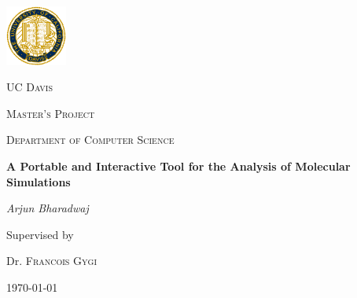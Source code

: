 \begin{titlepage}
	\centering
	\includegraphics[width=0.15\textwidth]{ucdavis_logo}\par\vspace{1cm}
	{\scshape\LARGE UC Davis \par}
	\vspace{1cm}
	{\scshape\Large Master's Project\par}
	\vspace{1cm}
	{\scshape\Large Department of Computer Science\par}
	\vspace{1.5cm}
	{\huge\bfseries A Portable and Interactive Tool for the Analysis of Molecular Simulations\par}
	\vspace{2cm}
	{\Large\itshape Arjun Bharadwaj\par}
	\vfill
	Supervised by\par
	Dr. \textsc{Francois Gygi}

	\vfill

	{\large \today\par}
\end{titlepage}